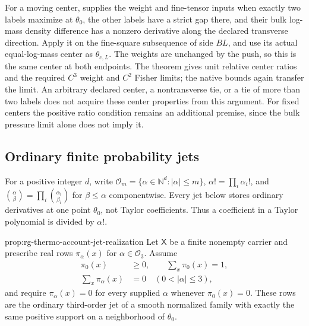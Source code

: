For a moving center,  supplies
the weight and fine-tensor inputs when exactly two labels maximize at
$\theta_0$, the other labels have a strict gap there, and their bulk
log-mass density difference has a nonzero derivative along the declared transverse
direction. Apply it on the fine-square subsequence of side $BL$, and
use its actual equal-log-mass center as $\theta_{c,L}$. The weights are
unchanged by the push, so this is the same center at both endpoints.
The theorem gives unit relative center ratios and the required $C^3$
weight and $C^2$ Fisher limits; the native bounds again transfer the
limit. An arbitrary declared center, a nontransverse tie, or a tie of
more than two labels does not acquire these center properties from this
argument. For fixed centers the positive ratio condition remains an
additional premise, since the bulk pressure limit alone does not imply it.\thermoestablishedstatus

\subsection{Ordinary finite probability jets}
\label{sec:rg-thermo-account-jets}

For a positive integer $d$, write
$\mathcal O_m=\{\alpha\in\mathbb N^d:|\alpha|\leq m\}$,
$\alpha!=\prod_i\alpha_i!$, and
$\binom\alpha\beta=\prod_i\binom{\alpha_i}{\beta_i}$ for
$\beta\leq\alpha$ componentwise. Every jet below stores ordinary
derivatives at one point $\theta_0$, not Taylor coefficients. Thus a
coefficient in a Taylor polynomial is divided by $\alpha!$.\thermodeclareddefinition


{prop:rg-thermo-account-jet-realization}
Let $\mathsf X$ be a finite nonempty carrier and prescribe real rows
$\pi_\alpha(x)$ for $\alpha\in\mathcal O_3$. Assume
\begin{equation}
 \begin{aligned}
 \pi_0(x)&\geq0,\qquad \sum_x\pi_0(x)=1,\\
 \sum_x\pi_\alpha(x)&=0\quad(0<|\alpha|\leq3),
 \end{aligned}
 \label{eq:rg-thermo-account-jet-admission}
\end{equation}
and require $\pi_\alpha(x)=0$ for every supplied $\alpha$ whenever
$\pi_0(x)=0$. These rows are the ordinary third-order jet of a smooth
normalized family with exactly the same positive support on a
neighborhood of $\theta_0$.\thermoestablishedstatus


